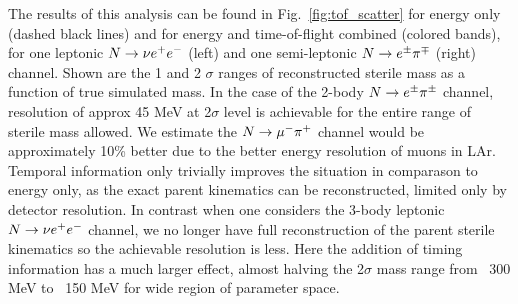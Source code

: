 \documentclass[11pt, a4paper]{article}
\newcommand{\reffig}[1]{Fig.~\ref{#1}}
\def\ster{\ensuremath N}
\begin{document}
The results of this analysis can be found in \reffig{fig:tof_scatter} for energy only (dashed black lines) and for energy and time-of-flight combined (colored bands), for one leptonic $\ster \rightarrow \nu e^+ e^-$ (left)  and one semi-leptonic $\ster \rightarrow e^\pm \pi^\mp$ (right) channel. Shown are the 1 and 2 $\sigma$ ranges of reconstructed sterile mass as a function of true simulated mass. In the case of the 2-body $\ster \rightarrow e^\pm \pi^\pm$ channel, resolution of approx 45 MeV at 2$\sigma$ level is achievable for the entire range of sterile mass allowed. We estimate the $\ster\rightarrow \mu^- \pi^+$ channel would be approximately 10\% better due to the better energy resolution of muons in LAr. Temporal information only trivially improves the situation in comparason to energy only, as the exact parent kinematics can be reconstructed, limited only by detector resolution. In contrast when one considers the 3-body leptonic $\ster \rightarrow \nu e^+ e^-$ channel, we no longer have full reconstruction of the parent sterile kinematics so the achievable resolution is less. Here the addition of timing information has a much larger effect, almost halving the 2$\sigma$ mass range from ~300 MeV to ~150 MeV for wide region of parameter space.
\end{document}
